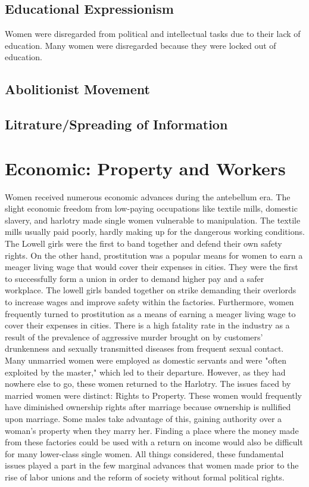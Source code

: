 \documentclass{article}
\begin{document}
\subsection{Educational Expressionism}



Women were disregarded from political and intellectual tasks due to their lack of education. Many women were disregarded because they were locked out of education.
\subsection{Abolitionist Movement}
\subsection{Litrature/Spreading of Information}
\section{Economic: Property and Workers}
Women received numerous economic advances during the antebellum era. The slight economic freedom from low-paying occupations like textile mills, domestic slavery, and harlotry made single women vulnerable to manipulation. The textile mills usually paid poorly, hardly making up for the dangerous working conditions. The Lowell girls were the first to band together and defend their own safety rights. On the other hand, prostitution was a popular means for women to earn a meager living wage that would cover their expenses in cities. They were the first to successfully form a union in order to demand higher pay and a safer workplace. The lowell girls banded together on strike demanding their overlords to increase wages and improve safety within the factories. Furthermore, women frequently turned to prostitution as a means of earning a meager living wage to cover their expenses in cities. There is a high fatality rate in the industry as a result of the prevalence of aggressive murder brought on by customers' drunkenness and sexually transmitted diseases from frequent sexual contact. Many unmarried women were employed as domestic servants and were "often exploited by the master,"\parencite{henretta} which led to their departure. However, as they had nowhere else to go, these women returned to the Harlotry. The issues faced by married women were distinct: Rights to Property. These women would frequently have diminished ownership rights after marriage because ownership is nullified upon marriage. Some males take advantage of this, gaining authority over a woman's property when they marry her. Finding a place where the money made from these factories could be used with a return on income would also be difficult for many lower-class single women. All things considered, these fundamental issues played a part in the few marginal advances that women made prior to the rise of labor unions and the reform of society without formal political rights.
\end{document}
